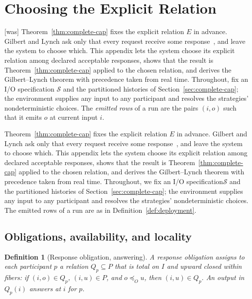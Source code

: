 \documentclass[sigconf]{cidr-2027}
\newtheorem{definition}{Definition}
\theoremstyle{remark}
\newcommand{\OutputOrd}{\preceq_O}
\newcommand{\Spec}{\mathcal{S}}
\newcommand{\spectype}[1][]{I/O specification#1\xspace}
\begin{document}
\section{Choosing the Explicit Relation}
\label{app:cap-response}



{\footnotesize\color{black!50}\noindent\textsf{[was]} Theorem~\ref{thm:complete-cap} fixes the explicit relation $E$ in advance.
Gilbert and Lynch ask only that every request receive some
response~\cite{gilbert2002cap}, and leave the system to choose which.  This
appendix lets the system choose its explicit relation among declared
acceptable responses, shows that the result is Theorem~\ref{thm:complete-cap}
applied to the chosen relation, and derives the Gilbert--Lynch theorem with
precedence taken from real time.  Throughout, fix an \spectype
$\Spec$ and the partitioned histories of Section~\ref{sec:complete-cap}; the
environment supplies any input to any participant and resolves the
strategies' nondeterministic choices.  The \emph{emitted rows} of a run are
the pairs $(i,o)$ such that it emits $o$ at current input $i$.\par}

\color{blue!70!black}Theorem~\ref{thm:complete-cap} fixes the explicit relation $E$ in advance.
Gilbert and Lynch ask only that every request receive some
response~\cite{gilbert2002cap}, and leave the system to choose which.  This
appendix lets the system choose its explicit relation among declared
acceptable responses, shows that the result is Theorem~\ref{thm:complete-cap}
applied to the chosen relation, and derives the Gilbert--Lynch theorem with
precedence taken from real time.  Throughout, we fix an \spectype $\Spec$ and the partitioned histories of
Section~\ref{sec:complete-cap}; the environment supplies any input to any
participant and resolves the strategies' nondeterministic choices.  The
emitted rows of a run are as in Definition~\ref{def:deployment}.\color{black}

\subsection{Obligations, availability, and locality}

\begin{definition}[Response obligation, answering]
\label{def:response-obligation}
A \emph{response obligation} assigns to each participant $p$ a relation
$Q_p\subseteq P$ that is total on $I$ and upward closed within fibers: if
$(i,o)\in Q_p$, $(i,u)\in P$, and $o\OutputOrd u$, then $(i,u)\in Q_p$.  An
output in $Q_p(i)$ \emph{answers} at $i$ for $p$.
\end{definition}
\end{document}
